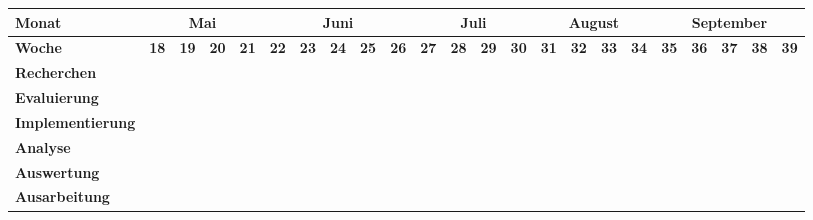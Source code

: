 \documentclass[lang=ngerman,inputenc=utf8,fontsize=10pt]{ldvarticle}
\begin{document}
\begin{center}
\begin{footnotesize}
\setlength{\arrayrulewidth}{1,05pt}
\begin{tabular}[htb]{|m{}|p{.05cm}|p{.05cm}|p{.05cm}|p{.05cm}|p{.05cm}|p{.05cm}|p{.05cm}|p{.05cm}|p{.05cm}|p{.05cm}|p{.05cm}|p{.05cm}|p{.05cm}|p{.05cm}|p{.05cm}|p{.05cm}|p{.05cm}|p{.05cm}|p{.05cm}|p{.05cm}|p{.05cm}|p{.05cm}|}
	\hline
	\textbf{Monat}& \multicolumn{4}{|c|}{Mai} & \multicolumn{5}{|c|}{Juni} & \multicolumn{4}{|c|}{Juli} & \multicolumn{4}{|c|}{August} & \multicolumn{5}{|c|}{September}\\ 
	\hline
	\textbf{Woche}&\tiny\textbf{18}&\tiny\textbf{19}&\tiny\textbf{20}&\tiny\textbf{21}& \tiny \textbf{22} & \tiny \textbf{23} & \tiny \textbf{24} & \tiny \textbf{25} &  \tiny \textbf{26} &  \tiny \textbf{27} &  \tiny \textbf{28} &  \tiny \textbf{29}  &  \tiny \textbf{30} &  \tiny \textbf{31} &  \tiny \textbf{32} &  \tiny \textbf{33} &  \tiny \textbf{34} &  \tiny \textbf{35}  &  \tiny \textbf{36} &  \tiny \textbf{37} &  \tiny \textbf{38}  &  \tiny \textbf{39}\\
	\hline
	\hline
	\rowcolor{lightgray} \textbf{Recherchen}& \cellcolor{red} & \cellcolor{red} & \cellcolor{red}& \cellcolor{red}& \cellcolor{red}& & & & & & & & & & & & & & & & &\\
	\hline
	\rowcolor{lightgray} \textbf{Evaluierung}& & & & & & \cellcolor{red} & \cellcolor{red} & & & & & & & & & & & & & & &\\
	\hline
	\rowcolor{lightgray} \textbf{Implementierung}& & & & & & & & \cellcolor{red} & \cellcolor{red} & \cellcolor{red} & \cellcolor{red} & \cellcolor{red} & & & & & & & & & &\\
	\hline
	\rowcolor{lightgray} \textbf{Analyse}& & & & & & & & & & & & & \cellcolor{red}& \cellcolor{red}& \cellcolor{red} & \cellcolor{red} & & & & & &\\
	\hline
	\rowcolor{lightgray} \textbf{Auswertung}& & & & & & & & & & & & & & & & \cellcolor{red} & \cellcolor{red} & \cellcolor{red} & & & &\\
	\hline
	\rowcolor{lightgray} \textbf{Ausarbeitung}& & & & & & & & & & & & & & & & & \cellcolor{red} &\cellcolor{red} & \cellcolor{red}& \cellcolor{red} &\cellcolor{red} & \cellcolor{red}\\
	\hline
		
\end{tabular}
\end{footnotesize}
\end{center}
\end{document}
